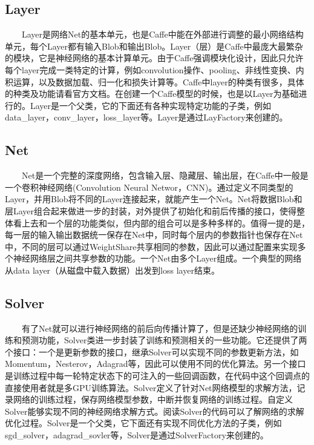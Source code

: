 \subsection{ Layer}\label{layer}

  Layer是网络Net的基本单元，也是Caffe中能在外部进行调整的最小网络结构单元，每个Layer都有输入Blob和输出Blob。Layer（层）是Caffe中最庞大最繁杂的模块，它是神经网络的基本计算单元。由于Caffe强调模块化设计，因此只允许每个layer完成一类特定的计算，例如convolution操作、pooling、非线性变换、内积运算，以及数据加载、归一化和损失计算等。Caffe中layer的种类有很多，具体的种类及功能请看官方文档。在创建一个Caffe模型的时候，也是以Layer为基础进行的。Layer是一个父类，它的下面还有各种实现特定功能的子类，例如data\_layer，conv\_layer，loss\_layer等。Layer是通过LayFactory来创建的。

\subsection{ Net}\label{net}

  Net是一个完整的深度网络，包含输入层、隐藏层、输出层，在Caffe中一般是一个卷积神经网络(Convolution
Neural
Networ，CNN)。通过定义不同类型的Layer，并用Blob将不同的Layer连接起来，就能产生一个Net。Net将数据Blob和层Layer组合起来做进一步的封装，对外提供了初始化和前后传播的接口，使得整体看上去和一个层的功能类似，但内部的组合可以是多种多样的。值得一提的是，每一层的输入输出数据统一保存在Net中，同时每个层内的参数指针也保存在Net中，不同的层可以通过WeightShare共享相同的参数，因此可以通过配置来实现多个神经网络层之间共享参数的功能。一个Net由多个Layer组成。一个典型的网络从data
layer（从磁盘中载入数据）出发到loss layer结束。

\subsection{ Solver}\label{solver}

  有了Net就可以进行神经网络的前后向传播计算了，但是还缺少神经网络的训练和预测功能，Solver类进一步封装了训练和预测相关的一些功能。它还提供了两个接口：一个是更新参数的接口，继承Solver可以实现不同的参数更新方法，如Momentum，Nesterov，Adagrad等，因此可以使用不同的优化算法。另一个接口是训练过程中每一轮特定状态下的可注入的一些回调函数，在代码中这个回调点的直接使用者就是多GPU训练算法。Solver定义了针对Net网络模型的求解方法，记录网络的训练过程，保存网络模型参数，中断并恢复网络的训练过程。自定义Solver能够实现不同的神经网络求解方式。阅读Solver的代码可以了解网络的求解优化过程。Solver是一个父类，它下面还有实现不同优化方法的子类，例如sgd\_solver，adagrad\_sovler等，Solver是通过SolverFactory来创建的。

